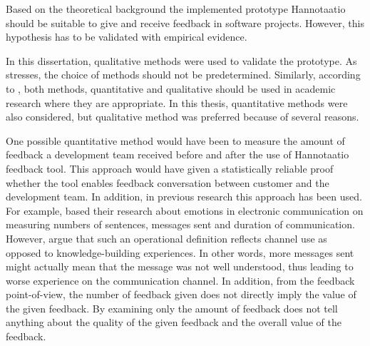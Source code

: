 \documentclass[english,12pt,a4paper,pdftex]{article}
\begin{document}

Based on the theoretical background the implemented prototype Hannotaatio should be suitable to give and receive feedback in software projects. However, this hypothesis has to be validated with empirical evidence. 

In this dissertation, qualitative methods were used to validate the prototype. As \citet{silverman2009} stresses, the choice of methods should not be predetermined. Similarly, according to \citet{gummesson1999}, both methods, quantitative and qualitative should be used in academic research where they are appropriate. In this thesis, quantitative methods were also considered, but qualitative method was preferred because of several reasons. 

One possible quantitative method would have been to measure the amount of feedback a development team received before and after the use of Hannotaatio feedback tool. This approach would have given a statistically reliable proof whether the tool enables feedback conversation between customer and the development team. In addition, in previous research this approach has been used. For example, \citet{rice1987} based their research about emotions in electronic communication on measuring numbers of sentences, messages sent and duration of communication. However, \citet{carlson1999} argue that such an operational definition reflects channel use as opposed to knowledge-building experiences. In other words, more messages sent might actually mean that the message was not well understood, thus leading to worse experience on the communication channel. In addition, from the feedback point-of-view, the number of feedback given does not directly imply the value of the given feedback. By examining only the amount of feedback does not tell anything about the quality of the given feedback and the overall value of the feedback. 
\end{document}
